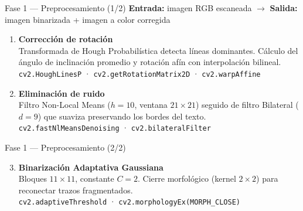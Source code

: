 \documentclass[aspectratio=169, 11pt]{beamer}
\newcommand{\lib}[1]{\texttt{\small\color{AccBlue}#1}}
\newcommand{\rojo}[1]{\textcolor{PriRed}{#1}}
\begin{document}
\begin{frame}{Fase 1 — Preprocesamiento (1/2)}
  \textbf{Entrada:} imagen RGB escaneada \quad $\rightarrow$ \quad
  \textbf{Salida:} imagen binarizada + imagen a color corregida
  \vspace{10pt}
  \begin{enumerate}[label=\textbf{\rojo{\arabic*.}}, leftmargin=1.8em, itemsep=10pt]
    \item \textbf{Corrección de rotación}\\
      Transformada de Hough Probabilística detecta líneas dominantes. Cálculo del ángulo de inclinación promedio y rotación afín con interpolación bilineal.\\
      \lib{cv2.HoughLinesP} · \lib{cv2.getRotationMatrix2D} · \lib{cv2.warpAffine}
    \item \textbf{Eliminación de ruido}\\
      Filtro Non-Local Means ($h{=}10$, ventana $21{\times}21$) seguido de filtro Bilateral ($d{=}9$) que suaviza preservando los bordes del texto.\\
      \lib{cv2.fastNlMeansDenoising} · \lib{cv2.bilateralFilter}
  \end{enumerate}
\end{frame}

\begin{frame}{Fase 1 — Preprocesamiento (2/2)}
  \begin{enumerate}[label=\textbf{\rojo{\arabic*.}}, leftmargin=1.8em, itemsep=10pt]
    \setcounter{enumi}{2}
    \item \textbf{Binarización Adaptativa Gaussiana}\\
      Bloques $11{\times}11$, constante $C{=}2$. Cierre morfológico (kernel $2{\times}2$) para reconectar trazos fragmentados.\\
      \lib{cv2.adaptiveThreshold} · \lib{cv2.morphologyEx(MORPH\_CLOSE)}
  \end{enumerate}
\end{frame}
\end{document}
